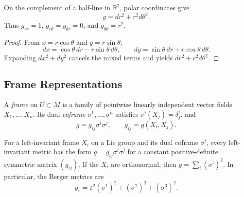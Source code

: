 \begin{example}
  \label{ex:pet-ch1-polar-coords}


  On the complement of a half-line in $\mathbb{R}^2$, polar coordinates give
  \[
    g=dr^2+r^2d\theta^2.
  \]
  Thus $g_{rr}=1$, $g_{r\theta}=g_{\theta r}=0$, and
  $g_{\theta\theta}=r^2$.
\end{example}
\begin{proof}

  \sketch
  From $x=r\cos\theta$ and $y=r\sin\theta$,
  \[
    dx=\cos\theta\,dr-r\sin\theta\,d\theta,
    \qquad
    dy=\sin\theta\,dr+r\cos\theta\,d\theta.
  \]
  Expanding $dx^2+dy^2$ cancels the mixed terms and yields
  $dr^2+r^2d\theta^2$.
\end{proof}

\subsection{Frame Representations}

\begin{definition}
  \label{def:pet-ch1-frame-metric}


  A \emph{frame} on $U\subset M$ is a family of pointwise linearly independent
  vector fields $X_1,\ldots,X_n$. Its dual \emph{coframe}
  $\sigma^1,\ldots,\sigma^n$ satisfies $\sigma^i(X_j)=\delta^i_j$, and
  \[
    g=g_{ij}\sigma^i\sigma^j,
    \qquad g_{ij}=g(X_i,X_j).
  \]
\end{definition}

\begin{example}
  \label{ex:pet-ch1-left-invariant-coframe}


  For a left-invariant frame $X_i$ on a Lie group and its dual coframe
  $\sigma^i$, every left-invariant metric has the form
  $g=g_{ij}\sigma^i\sigma^j$ for a constant positive-definite symmetric matrix
  $(g_{ij})$. If the $X_i$ are orthonormal, then
  $g=\sum_i(\sigma^i)^2$. In particular, the Berger metrics are
  \[
    g_\varepsilon=\varepsilon^2(\sigma^1)^2
      +(\sigma^2)^2+(\sigma^3)^2.
  \]
\end{example}

